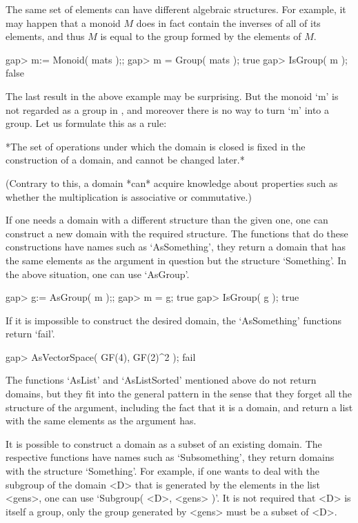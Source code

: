 The same set of elements can have different algebraic structures.
For example, it may happen that a monoid $M$ does in fact contain
the inverses of all of its elements, and thus $M$ is equal to the group
formed by the elements of $M$.

\beginexample
    gap> m:= Monoid( mats );;
    gap> m = Group( mats );
    true
    gap> IsGroup( m );
    false
\endexample

The last result in the above example may be surprising.
But the monoid `m' is not regarded as a group in {\GAP},
and moreover there is no way to turn `m' into a group.
Let us formulate this as a rule:

*The set of operations under which the domain is closed is fixed
in the construction of a domain, and cannot be changed later.*

(Contrary to this, a domain *can* acquire knowledge about properties
such as whether the multiplication is associative or commutative.)

If one needs a domain with a different structure than the given one,
one can construct a new domain with the required structure.
The functions that do these constructions have names such as
`AsSomething', they return a domain that has the same elements as the
argument in question but the structure `Something'.
In the above situation, one can use `AsGroup'.

\beginexample
    gap> g:= AsGroup( m );;
    gap> m = g;
    true
    gap> IsGroup( g );
    true
\endexample

If it is impossible to construct the desired domain, the `AsSomething'
functions return `fail'.

\beginexample
    gap> AsVectorSpace( GF(4), GF(2)^2 );
    fail
\endexample

The functions `AsList' and `AsListSorted' mentioned above do not return
domains, but they fit into the general pattern in the sense that they
forget all the structure of the argument, including the fact that it is
a domain, and return a list with the same elements as the argument has.



It is possible to construct a domain as a subset of an existing domain.
The respective functions have names such as `Subsomething',
they return domains with the structure `Something'.
For example, if one wants to deal with the subgroup of the domain <D>
that is generated by the elements in the list <gens>,
one can use `Subgroup( <D>, <gens> )'.
It is not required that <D> is itself a group, only the group generated
by <gens> must be a subset of <D>.


